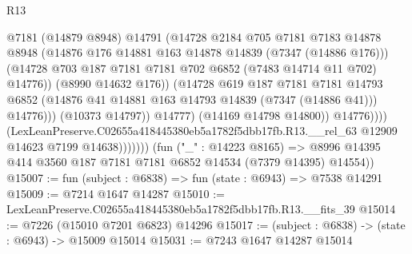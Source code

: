 \begin{lexlean}{R13}
\begin{coremodule}
                                      @7181
                                      (@14879 @8948)
                                      @14791
                                      (@14728
                                        @2184
                                        @705
                                        @7181
                                        @7183
                                        @14878
                                        @8948
                                        (@14876
                                          @176
                                          @14881
                                          @163
                                          @14878
                                          @14839
                                          (@7347 (@14886 @176)))
                                        (@14728
                                          @703
                                          @187
                                          @7181
                                          @7181
                                          @702
                                          @6852
                                          (@7483 @14714 @11 @702)
                                          @14776))
                                      (@8990 @14632 @176))
                                    (@14728
                                      @619
                                      @187
                                      @7181
                                      @7181
                                      @14793
                                      @6852
                                      (@14876 @41 @14881 @163 @14793 @14839 (@7347 (@14886 @41)))
                                      @14776)))
                                (@10373 @14797))
                              @14777)
                            (@14169 @14798 @14800))
                          @14776))))
                  (LexLeanPreserve.C02655a418445380eb5a1782f5dbb17fb.R13.__rel_63
                    @12909
                    @14623
                    @7199
                    @14638)))))))
      (fun ("_" : @14223 @8165) =>
      @8996 @14395 @414 @3560 @187 @7181 @7181 @6852 @14534 (@7379 @14395) @14554))
@15007 := fun (subject : @6838) => fun (state : @6943) => @7538 @14291
@15009 := @7214 @1647 @14287
@15010 := LexLeanPreserve.C02655a418445380eb5a1782f5dbb17fb.R13.__fits_39
@15014 := @7226 (@15010 @7201 @6823) @14296
@15017 := (subject : @6838) -> (state : @6943) -> @15009 @15014
@15031 := @7243
    @1647
    @14287
    @15014

\end{coremodule}
\end{lexlean}
